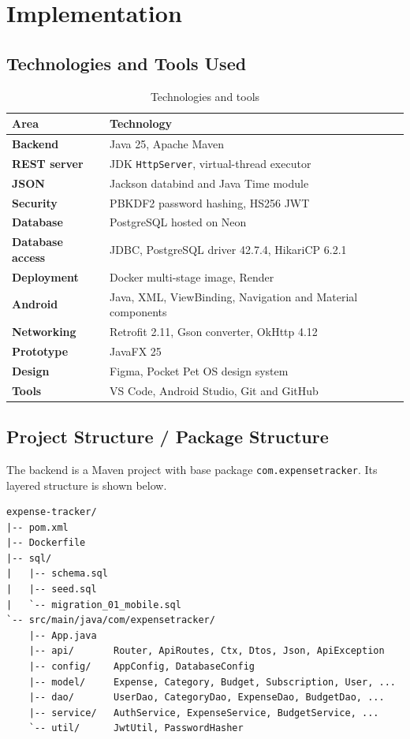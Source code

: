 \documentclass[12pt,a4paper]{report}
\begin{document}
\chapter{Implementation}
\section{Technologies and Tools Used}
\begin{table}[H]\centering\caption{Technologies and tools}\label{tab:tech}\small
\begin{tabularx}{\linewidth}{@{}>{\bfseries}lX@{}}\toprule Area & Technology\\\midrule
Backend & Java 25, Apache Maven\\
REST server & JDK \texttt{HttpServer}, virtual-thread executor\\
JSON & Jackson databind and Java Time module\\
Security & PBKDF2 password hashing, HS256 JWT\\
Database & PostgreSQL hosted on Neon\\
Database access & JDBC, PostgreSQL driver 42.7.4, HikariCP 6.2.1\\
Deployment & Docker multi-stage image, Render\\
Android & Java, XML, ViewBinding, Navigation and Material components\\
Networking & Retrofit 2.11, Gson converter, OkHttp 4.12\\
Prototype & JavaFX 25\\
Design & Figma, Pocket Pet OS design system\\
Tools & VS Code, Android Studio, Git and GitHub\\\bottomrule
\end{tabularx}\end{table}

\newpage
\section{Project Structure / Package Structure}
The backend is a Maven project with base package \texttt{com.expensetracker}. Its layered structure is shown below.

\begin{minipage}{\linewidth}
\begin{lstlisting}[style=plainstyle,caption={Backend project structure},aboveskip=6pt,belowskip=6pt]
expense-tracker/
|-- pom.xml
|-- Dockerfile
|-- sql/
|   |-- schema.sql
|   |-- seed.sql
|   `-- migration_01_mobile.sql
`-- src/main/java/com/expensetracker/
    |-- App.java
    |-- api/       Router, ApiRoutes, Ctx, Dtos, Json, ApiException
    |-- config/    AppConfig, DatabaseConfig
    |-- model/     Expense, Category, Budget, Subscription, User, ...
    |-- dao/       UserDao, CategoryDao, ExpenseDao, BudgetDao, ...
    |-- service/   AuthService, ExpenseService, BudgetService, ...
    `-- util/      JwtUtil, PasswordHasher
\end{lstlisting}
\end{minipage}
\end{document}
